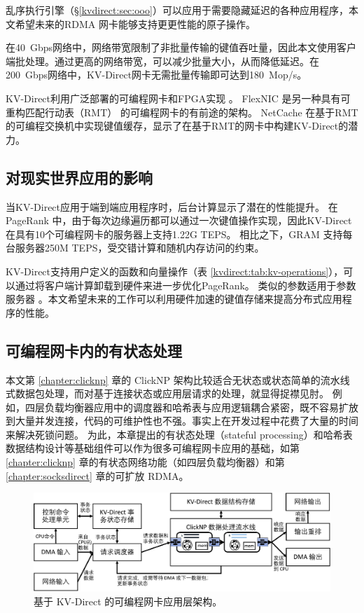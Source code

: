 乱序执行引擎（\S \ref {kvdirect:sec:ooo}）可以应用于需要隐藏延迟的各种应用程序，本文希望未来的RDMA 网卡能够支持更更性能的原子操作。

在40~Gbps网络中，网络带宽限制了非批量传输的键值吞吐量，因此本文使用客户端批处理。通过更高的网络带宽，可以减少批量大小，从而降低延迟。在200~Gbps网络中，KV-Direct网卡无需批量传输即可达到180~Mop/s。

KV-Direct利用广泛部署的可编程网卡和FPGA实现 \cite{putnam2014reconfigurable,caulfield2016cloud}。 FlexNIC \cite {kaufmann2015flexnic,kaufmann2016krishnamurthy} 是另一种具有可重构匹配行动表（RMT） \cite {bosshart2013forwarding} 的可编程网卡的有前途的架构。
NetCache \cite {netcache-sosp17} 在基于RMT的可编程交换机中实现键值缓存，显示了在基于RMT的网卡中构建KV-Direct的潜力。

\subsection{对现实世界应用的影响}

当KV-Direct应用于端到端应用程序时，后台计算显示了潜在的性能提升。 在PageRank \cite {page1999pagerank}中，由于每次边缘遍历都可以通过一次键值操作实现，因此KV-Direct在具有10个可编程网卡的服务器上支持1.22G TEPS。 相比之下，GRAM \cite {wu2015g}支持每台服务器250M TEPS，受交错计算和随机内存访问的约束。

KV-Direct支持用户定义的函数和向量操作（表 \ref {kvdirect:tab:kv-operations}），可以通过将客户端计算卸载到硬件来进一步优化PageRank。 类似的参数适用于参数服务器 \cite {li2014scaling}。本文希望未来的工作可以利用硬件加速的键值存储来提高分布式应用程序的性能。

\subsection{可编程网卡内的有状态处理}

本文第 \ref{chapter:clicknp} 章的 ClickNP 架构比较适合无状态或状态简单的流水线式数据包处理，而对基于连接状态或应用层请求的处理，就显得捉襟见肘。
例如，四层负载均衡器应用中的调度器和哈希表与应用逻辑耦合紧密，既不容易扩放到大量并发连接，代码的可维护性也不强。事实上在开发过程中花费了大量的时间来解决死锁问题。
为此，本章提出的有状态处理（stateful processing）和哈希表数据结构设计等基础组件可以作为很多可编程网卡应用的基础，如第 \ref{chapter:clicknp} 章的有状态网络功能（如四层负载均衡器）和第 \ref{chapter:socksdirect} 章的可扩放 RDMA。


\begin{figure}[htbp]
	\centering
	\includegraphics[width=1.0\textwidth]{../figures/kvdirect_arch.pdf}
	\caption{基于 KV-Direct 的可编程网卡应用层架构。}
	\label{arch:fig:kvdirect_arch}
\end{figure}


